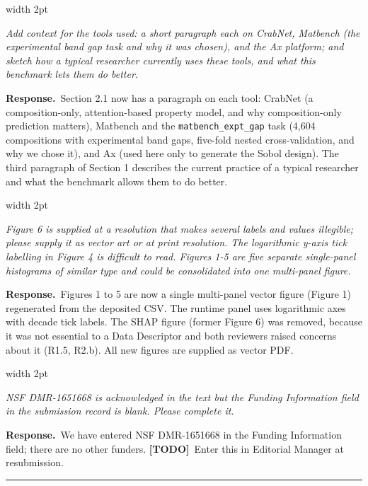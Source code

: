 \documentclass[11pt]{article}
\newenvironment{comment}
  {\par\medskip\noindent
   \begingroup\color{revrule}\leaders\vrule width 2pt\hfill\kern0pt\par\nobreak
   \endgroup
   \begin{list}{}{\setlength{\leftmargin}{1.5em}\setlength{\rightmargin}{0.5em}}%
   \item\itshape\ignorespaces}
  {\end{list}\par}
\newcommand{\response}{\par\noindent\textbf{\color{respblue}Response.}\ }
\newcommand{\todo}{\textbf{\color{red}[TODO]}\ }
\newcommand{\reviewer}[1]{\bigskip\noindent{\large\bfseries #1}\par
  \rule{\linewidth}{0.8pt}\par}
\begin{document}
\begin{comment}
Add context for the tools used: a short paragraph each on CrabNet, Matbench (the experimental band gap task and why it was chosen), and the Ax platform; and sketch how a typical researcher currently uses these tools, and what this benchmark lets them do better.
\end{comment}
\response Section 2.1 now has a paragraph on each tool: CrabNet (a composition-only, attention-based property model, and why composition-only prediction matters), Matbench and the \texttt{matbench\_expt\_gap} task (4,604 compositions with experimental band gaps, five-fold nested cross-validation, and why we chose it), and Ax (used here only to generate the Sobol design). The third paragraph of Section 1 describes the current practice of a typical researcher and what the benchmark allows them to do better.

\begin{comment}
Figure 6 is supplied at a resolution that makes several labels and values illegible; please supply it as vector art or at print resolution. The logarithmic y-axis tick labelling in Figure 4 is difficult to read. Figures 1-5 are five separate single-panel histograms of similar type and could be consolidated into one multi-panel figure.
\end{comment}
\response Figures 1 to 5 are now a single multi-panel vector figure (Figure 1) regenerated from the deposited CSV. The runtime panel uses logarithmic axes with decade tick labels. The SHAP figure (former Figure 6) was removed, because it was not essential to a Data Descriptor and both reviewers raised concerns about it (R1.5, R2.b). All new figures are supplied as vector PDF.

\begin{comment}
NSF DMR-1651668 is acknowledged in the text but the Funding Information field in the submission record is blank. Please complete it.
\end{comment}
\response We have entered NSF DMR-1651668 in the Funding Information field; there are no other funders. \todo Enter this in Editorial Manager at resubmission.

\reviewer{Reviewer 1}
\end{document}
